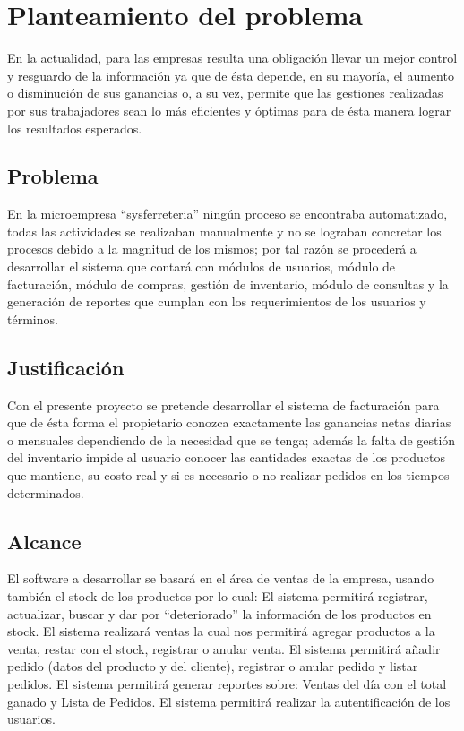 \documentclass[preprint,12pt]{elsarticle}
\begin{document}
\section{Planteamiento del problema}
En la actualidad, para las empresas resulta una obligación llevar un mejor control y resguardo
de la información ya que de ésta depende, en su mayoría, el aumento o disminución de sus
ganancias o, a su vez, permite que las gestiones realizadas por sus trabajadores sean lo más
eficientes y óptimas para de ésta manera lograr los resultados esperados.

	\subsection{\textbf{Problema}}
 En la microempresa “sysferreteria” ningún proceso se encontraba automatizado, todas
las actividades se realizaban manualmente y no se lograban concretar los procesos debido a la
magnitud de los mismos; por tal razón se procederá a desarrollar el sistema que contará con
módulos de usuarios, módulo de facturación, módulo de compras, gestión de inventario, módulo
de consultas y la generación de reportes que cumplan con los requerimientos de los usuarios
 y términos.\cite{refaquino3}
	\subsection{\textbf{Justificación }}
Con el  presente proyecto  se pretende desarrollar el sistema de facturación para que de ésta forma el propietario conozca exactamente las ganancias netas diarias o mensuales
dependiendo de la necesidad que se tenga; además la falta de gestión del inventario impide al
usuario conocer las cantidades exactas de los productos que mantiene, su costo real y si es
necesario o no realizar pedidos en los tiempos determinados.

	\subsection{\textbf{ Alcance }}
El software a desarrollar se basará en el área de ventas de la empresa, usando también el stock de los productos por lo cual:
El sistema permitirá registrar, actualizar, buscar y dar por “deteriorado” la información de los productos en stock. 
El sistema realizará ventas la cual nos permitirá agregar productos a la venta, restar con el stock, registrar o anular venta. 
El sistema permitirá añadir pedido (datos del producto y del cliente), registrar o anular pedido y listar pedidos.
El sistema permitirá generar reportes sobre: Ventas del día con el total ganado y Lista de Pedidos.
El sistema permitirá realizar la autentificación de los usuarios.\cite{refaquino3}
\end{document}
